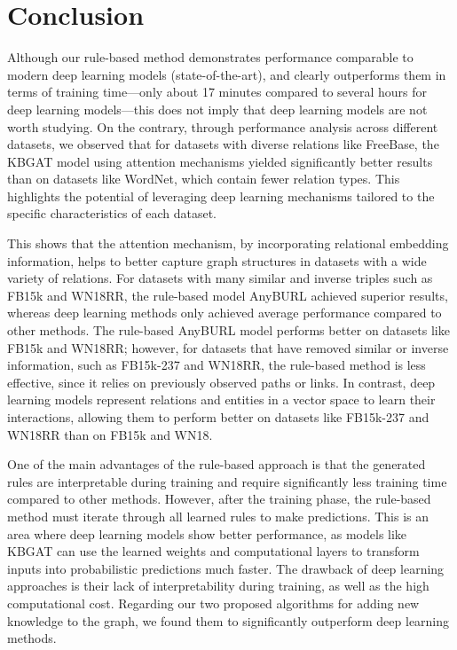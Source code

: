 \section{Conclusion}
\label{chap:Conclusion}

Although our rule-based method demonstrates performance comparable to modern deep learning models (state-of-the-art), and clearly outperforms them in terms of training time—only about 17 minutes compared to several hours for deep learning models—this does not imply that deep learning models are not worth studying. On the contrary, through performance analysis across different datasets, we observed that for datasets with diverse relations like FreeBase, the KBGAT model using attention mechanisms yielded significantly better results than on datasets like WordNet, which contain fewer relation types. This highlights the potential of leveraging deep learning mechanisms tailored to the specific characteristics of each dataset.

This shows that the attention mechanism, by incorporating relational embedding information, helps to better capture graph structures in datasets with a wide variety of relations.  
For datasets with many similar and inverse triples such as FB15k and WN18RR, the rule-based model AnyBURL achieved superior results, whereas deep learning methods only achieved average performance compared to other methods.  
The rule-based AnyBURL model performs better on datasets like FB15k and WN18RR; however, for datasets that have removed similar or inverse information, such as FB15k-237 and WN18RR, the rule-based method is less effective, since it relies on previously observed paths or links. In contrast, deep learning models represent relations and entities in a vector space to learn their interactions, allowing them to perform better on datasets like FB15k-237 and WN18RR than on FB15k and WN18.

One of the main advantages of the rule-based approach is that the generated rules are interpretable during training and require significantly less training time compared to other methods. However, after the training phase, the rule-based method must iterate through all learned rules to make predictions. This is an area where deep learning models show better performance, as models like KBGAT can use the learned weights and computational layers to transform inputs into probabilistic predictions much faster. The drawback of deep learning approaches is their lack of interpretability during training, as well as the high computational cost. Regarding our two proposed algorithms for adding new knowledge to the graph, we found them to significantly outperform deep learning methods.


